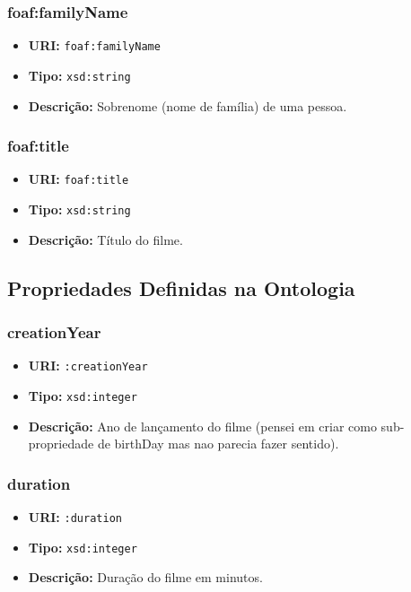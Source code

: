 \documentclass[12pt,a4paper]{article}
\begin{document}
\subsubsection{foaf:familyName}
\begin{itemize}
    \item \textbf{URI:} \texttt{foaf:familyName}
    \item \textbf{Tipo:} \texttt{xsd:string}
    \item \textbf{Descrição:} Sobrenome (nome de família) de uma pessoa.
\end{itemize}

\subsubsection{foaf:title}
\begin{itemize}
    \item \textbf{URI:} \texttt{foaf:title}
    \item \textbf{Tipo:} \texttt{xsd:string}
    \item \textbf{Descrição:} Título do filme.
\end{itemize}

\subsection{Propriedades Definidas na Ontologia}

\subsubsection{creationYear}
\begin{itemize}
    \item \textbf{URI:} \texttt{:creationYear}
    \item \textbf{Tipo:} \texttt{xsd:integer}
    \item \textbf{Descrição:} Ano de lançamento do filme (pensei em criar como sub-propriedade de birthDay mas nao parecia fazer sentido).
\end{itemize}

\subsubsection{duration}
\begin{itemize}
    \item \textbf{URI:} \texttt{:duration}
    \item \textbf{Tipo:} \texttt{xsd:integer}
    \item \textbf{Descrição:} Duração do filme em minutos.
\end{itemize}
\end{document}
